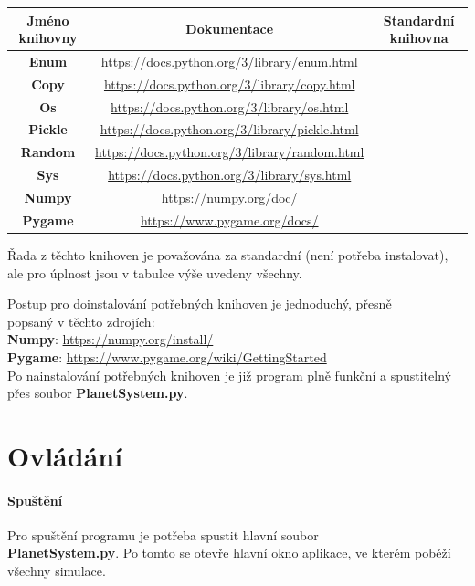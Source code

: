 \documentclass[a4paper, 12pt]{article}
\newcommand{\cmark}{\ding{51}}
\newcommand{\xmark}{\ding{55}}
\newcommand{\pgm}{PlanetSystem.py}
\begin{document}
\begin{table}[h!]
\centering
\hspace*{-1.5cm}
\begin{tabular}{ |c|c|c| }
 \hline
 Jméno knihovny & Dokumentace & Standardní knihovna\\
 \hline
 \textbf{Enum} & \url{https://docs.python.org/3/library/enum.html} & \cmark\\
 \hline
 \textbf{Copy} & \url{https://docs.python.org/3/library/copy.html} & \cmark\\
 \hline
 \textbf{Os} & \url{https://docs.python.org/3/library/os.html} & \cmark\\
 \hline
 \textbf{Pickle} & \url{https://docs.python.org/3/library/pickle.html} & \cmark\\
 \hline
 \textbf{Random} & \url{https://docs.python.org/3/library/random.html} & \cmark\\
 \hline
 \textbf{Sys} & \url{https://docs.python.org/3/library/sys.html} & \cmark\\
 \hline
 \textbf{Numpy} & \url{https://numpy.org/doc/} & \xmark\\
 \hline
 \textbf{Pygame} & \url{https://www.pygame.org/docs/} & \xmark\\
 \hline
\end{tabular}

\vspace{0.25cm}
\footnotesize{Řada z těchto knihoven je považována za standardní (není
potřeba instalovat), ale pro úplnost jsou v tabulce výše uvedeny všechny.}
\end{table}

\pagebreak
Postup pro doinstalování potřebných knihoven je jednoduchý, přesně \\popsaný v
těchto zdrojích:\\
\textbf{Numpy}: \url{https://numpy.org/install/}\\
\textbf{Pygame}: \url{https://www.pygame.org/wiki/GettingStarted}\\

Po nainstalování potřebných knihoven je již program plně funkční a spustitelný
přes soubor \textbf{PlanetSystem.py}.

\section{Ovládání}
\paragraph{Spuštění}
Pro spuštění programu je potřeba spustit hlavní soubor \\\textbf{\pgm}. Po tomto se
otevře hlavní okno aplikace, ve kterém poběží všechny simulace.
\end{document}
